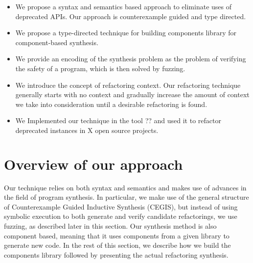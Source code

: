 \documentclass[runningheads,a4paper]{llncs}
\begin{document}
\begin{itemize}

\item We propose a syntax and semantics based approach to eliminate uses of deprecated APIs. Our approach is counterexample guided and type directed.

\item We propose a type-directed technique for building components library for component-based synthesis.
  
\item We provide an encoding of the synthesis problem as the problem of verifying the safety of a program, which is then solved by fuzzing.

\item We introduce the concept of refactoring context. %
  Our refactoring technique generally starts 
  with no context and gradually increase the amount of context we take into consideration
  until a desirable refactoring is found.

\item We Implemented our technique in the tool ?? and used it to
  refactor deprecated instances in X open source projects.
  
\end{itemize}  

%



\section{Overview of our approach} \label{sec:approach}

Our technique relies on both syntax and semantics and makes use of advances in the
field of program synthesis. In particular, we make use of the general
structure of Counterexample Guided Inductive Synthesis (CEGIS), but
instead of using symbolic execution to both generate and verify
candidate refactorings, we use fuzzing, as described later in this
section.  Our synthesis method is also component based, meaning that
it uses components from a given library to generate new code.  In the
rest of this section, we describe how we build the components library
followed by presenting the actual refactoring synthesis.
\end{document}
